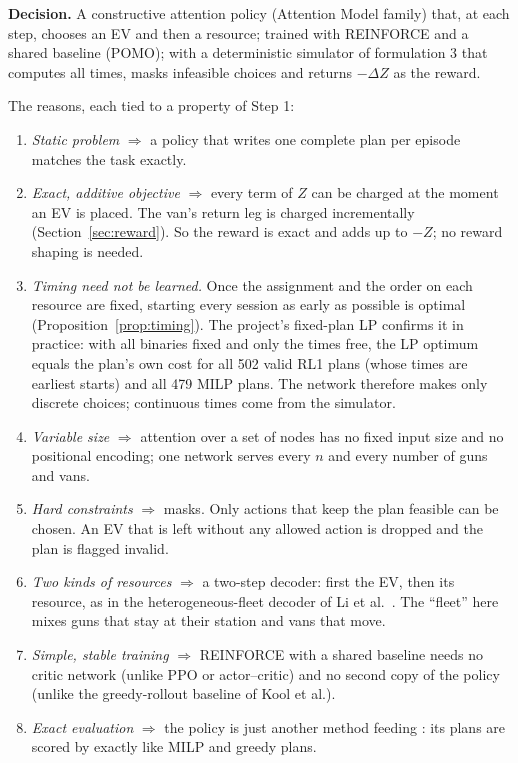 \begin{keybox}
\textbf{Decision.} A constructive attention policy (Attention Model family) that, at each step, chooses an EV and then a resource; trained with REINFORCE and a shared baseline (POMO); with a deterministic simulator of formulation 3 that computes all times, masks infeasible choices and returns $-\Delta Z$ as the reward.
\end{keybox}

The reasons, each tied to a property of Step 1:
\begin{enumerate}
  \item \emph{Static problem} $\Rightarrow$ a policy that writes one complete plan per episode matches the task exactly.
  \item \emph{Exact, additive objective} $\Rightarrow$ every term of $Z$ can be charged at the moment an EV is placed. The van's return leg is charged incrementally (Section~\ref{sec:reward}). So the reward is exact and adds up to $-Z$; no reward shaping is needed.
  \item \emph{Timing need not be learned.} Once the assignment and the order on each resource are fixed, starting every session as early as possible is optimal (Proposition~\ref{prop:timing}). The project's fixed-plan LP confirms it in practice: with all binaries fixed and only the times free, the LP optimum equals the plan's own cost for all 502 valid RL1 plans (whose times are earliest starts) and all 479 MILP plans. The network therefore makes only discrete choices; continuous times come from the simulator.
  \item \emph{Variable size} $\Rightarrow$ attention over a set of nodes has no fixed input size and no positional encoding; one network serves every $n$ and every number of guns and vans.
  \item \emph{Hard constraints} $\Rightarrow$ masks. Only actions that keep the plan feasible can be chosen. An EV that is left without any allowed action is dropped and the plan is flagged invalid.
  \item \emph{Two kinds of resources} $\Rightarrow$ a two-step decoder: first the EV, then its resource, as in the heterogeneous-fleet decoder of Li et al.\ \cite{li2021}. The ``fleet'' here mixes guns that stay at their station and vans that move.
  \item \emph{Simple, stable training} $\Rightarrow$ REINFORCE with a shared baseline needs no critic network (unlike PPO or actor--critic) and no second copy of the policy (unlike the greedy-rollout baseline of Kool et al.).
  \item \emph{Exact evaluation} $\Rightarrow$ the policy is just another method feeding : its plans are scored by  exactly like MILP and greedy plans.
\end{enumerate}

